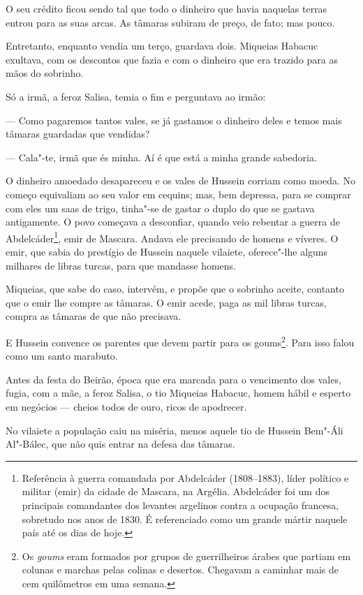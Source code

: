 O seu crédito ficou sendo tal que todo o dinheiro que havia naquelas
terras entrou para as suas arcas. As tâmaras subiram de preço, de fato;
mas pouco.

Entretanto, enquanto vendia um terço, guardava dois. Miqueias Habacuc
exultava, com os descontos que fazia e com o dinheiro que era trazido
para as mãos do sobrinho.

Só a irmã, a feroz Salisa, temia o fim e perguntava ao irmão:

--- Como pagaremos tantos vales, se já gastamos o dinheiro deles e temos
mais tâmaras guardadas que vendidas?

--- Cala"-te, irmã que és minha. Aí é que está a minha grande sabedoria.

O dinheiro amoedado desapareceu e os vales de Hussein corriam como
moeda. No começo equivaliam ao seu valor em cequins; mas, bem depressa,
para se comprar com eles um saas de trigo, tinha"-se de gastar o duplo do
que se gastava antigamente. O povo começava a desconfiar, quando veio
rebentar a guerra de
Abdelcáder\footnote{Referência à
  guerra comandada por Abdelcáder (1808--1883), líder político e
  militar (emir) da cidade de Mascara, na Argélia. Abdelcáder foi um dos
  principais comandantes dos levantes argelinos contra a ocupação
  francesa, sobretudo nos anos de 1830. É referenciado como um grande
  mártir naquele país até os dias de hoje.}, emir de Mascara. Andava ele
precisando de homens e víveres. O emir, que sabia do prestígio de
Hussein naquele vilaiete, oferece"-lhe alguns milhares de libras turcas,
para que mandasse homens.

Miqueias, que sabe do caso, intervém, e propõe que o sobrinho aceite,
contanto que o emir lhe compre as tâmaras. O emir acede, paga as mil
libras turcas, compra as tâmaras de que não precisava.

E Hussein convence os parentes que devem partir para os
goums\footnote{Os \emph{goums}
  eram formados por grupos de guerrilheiros árabes que partiam em
  colunas e marchas pelas colinas e desertos. Chegavam a caminhar mais
  de cem quilômetros em uma semana.}. Para isso falou como um santo
marabuto.

Antes da festa do Beirão, época que era marcada para o vencimento dos
vales, fugia, com a mãe, a feroz Salisa, o tio Miqueias Habacuc, homem
hábil e esperto em negócios --- cheios todos de ouro, ricos de
apodrecer.

No vilaiete a população caiu na miséria, menos aquele tio de Hussein
Bem"-Áli Al"-Bálec, que não quis entrar na defesa das tâmaras.

